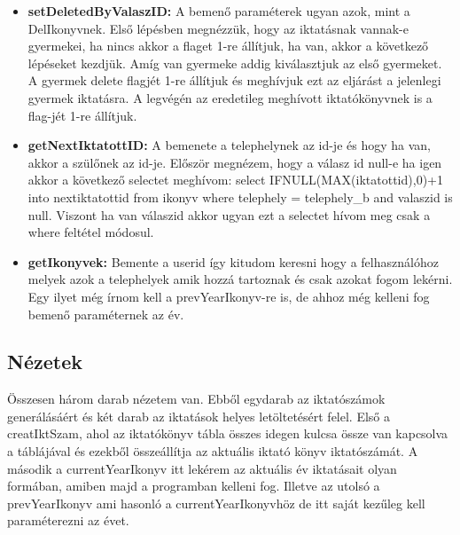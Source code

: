 \documentclass[
]{thesis-ekf}
\theoremstyle{definition}
\theoremstyle{remark}
\begin{document}
\begin{itemize}[leftmargin=0pt]
	\item[] \textbf{setDeletedByValaszID: }A bemenő paraméterek ugyan azok, mint a DelIkonyvnek. Első lépésben megnézzük, hogy az iktatásnak vannak-e gyermekei, ha nincs akkor a flaget 1-re állítjuk, ha van, akkor a következő lépéseket kezdjük. Amíg van gyermeke addig kiválasztjuk az első gyermeket. A gyermek delete flagjét 1-re állítjuk és meghívjuk ezt az eljárást a jelenlegi gyermek iktatásra. A legvégén az eredetileg meghívott iktatókönyvnek is a flag-jét 1-re állítjuk. 
	\item[] \textbf{getNextIktatottID: }A bemenete a telephelynek az id-je és hogy ha van, akkor a szülőnek az id-je. Először megnézem, hogy a válasz id null-e ha igen akkor a következő selectet meghívom:  select IFNULL(MAX(iktatottid),0)+1 into nextiktatottid from ikonyv where telephely = telephely\_b and valaszid is null. Viszont ha van válaszid akkor ugyan ezt a selectet hívom meg csak a where feltétel módosul.
	\item[] \textbf{getIkonyvek: }Bemente a userid így kitudom keresni hogy a felhasználóhoz melyek azok a telephelyek amik hozzá tartoznak és csak azokat fogom lekérni. Egy ilyet még írnom kell a prevYearIkonyv-re is, de ahhoz még kelleni fog bemenő paraméternek az év. 
\end{itemize}
\subsection{Nézetek}
Összesen három darab nézetem van. Ebből egydarab az iktatószámok generálásáért és két darab az iktatások helyes letöltetésért felel. Első a creatIktSzam, ahol az iktatókönyv tábla összes idegen kulcsa össze van kapcsolva a táblájával és ezekből összeállítja az aktuális iktató könyv iktatószámát. A második a currentYearIkonyv itt lekérem az aktuális év iktatásait olyan formában, amiben majd a programban kelleni fog. Illetve az utolsó a prevYearIkonyv ami hasonló a currentYearIkonyvhöz de itt saját kezűleg kell paraméterezni az évet.
\end{document}
